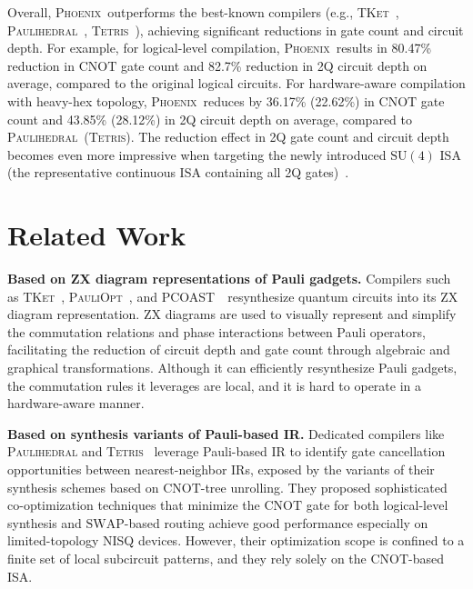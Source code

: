 \documentclass[conference,9pt]{IEEEtran}
\newcommand{\phoenix}{\textsc{Phoenix}}
\newcommand{\tket}{\textsc{TKet}}
\newcommand{\tetris}{\textsc{Tetris}}
\newcommand{\paulihedral}{\textsc{Paulihedral}}
\newcommand{\pauliopt}{\textsc{PauliOpt}}
\newcommand{\pcoast}{\textsc{PCOAST}}
\newcommand{\SWAP}{\mathrm{SWAP}}
\newcommand{\CNOT}{\mathrm{CNOT}}
\newcommand{\SUfour}{\mathrm{SU}(4)}
\begin{document}
    Overall, \phoenix\ outperforms the best-known compilers (e.g., \tket~\cite{sivarajah2020t}, \paulihedral~\cite{li2022paulihedral}, \tetris~\cite{jin2024tetris}), achieving significant reductions in gate count and circuit depth. For example, for logical-level compilation, \phoenix\ results in 80.47\% reduction in $ \CNOT $ gate count and 82.7\% reduction in 2Q circuit depth on average, compared to the original logical circuits. For hardware-aware compilation with heavy-hex topology, \phoenix\ reduces by 36.17\% (22.62\%) in $ \CNOT $ gate count and 43.85\% (28.12\%) in 2Q circuit depth on average, compared to \paulihedral\ (\tetris). The reduction effect in 2Q gate count and circuit depth becomes even more impressive when targeting the newly introduced $ \SUfour $ ISA (the representative continuous ISA containing all 2Q gates)~\cite{chen2024one}.






\section{Related Work}

    \textbf{Based on ZX diagram representations of Pauli gadgets.} Compilers such as \tket~\cite{sivarajah2020t,cowtan2019phase}, \pauliopt~\cite{van2023towards}, and \pcoast~\cite{paykin2023pcoast}\ resynthesize quantum circuits into its ZX diagram representation. ZX diagrams are used to visually represent and simplify the commutation relations and phase interactions between Pauli operators, facilitating the reduction of circuit depth and gate count through algebraic and graphical transformations. Although it can efficiently resynthesize Pauli gadgets, the commutation rules it leverages are local, and it is hard to operate in a hardware-aware manner.



    \textbf{Based on synthesis variants of Pauli-based IR.} Dedicated compilers like \paulihedral\cite{li2022paulihedral} and \tetris~\cite{jin2024tetris} leverage Pauli-based IR to identify gate cancellation opportunities between nearest-neighbor IRs, exposed by the variants of their synthesis schemes based on $\CNOT$-tree unrolling. They proposed sophisticated co-optimization techniques that minimize the $ \CNOT $ gate for both logical-level synthesis and $\SWAP$-based routing achieve good performance especially on limited-topology NISQ devices. However, their optimization scope is confined to a finite set of local subcircuit patterns, and they rely solely on the $ \CNOT $-based ISA.
\end{document}
